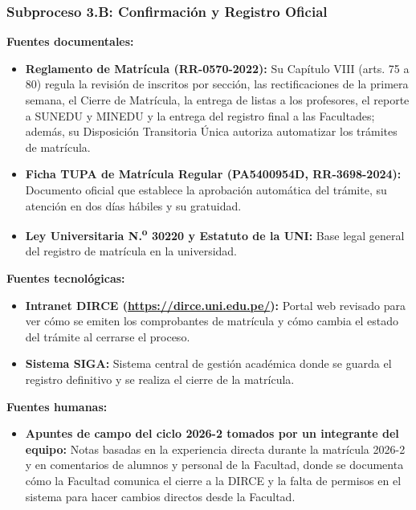 \subsubsection{Subproceso 3.B: Confirmación y Registro Oficial}

\textbf{Fuentes documentales:}
\begin{itemize}
    \item \textbf{Reglamento de Matrícula (RR-0570-2022):} Su Capítulo VIII (arts. 75\textdegree{} a 80\textdegree{}) regula la revisión de inscritos por sección, las rectificaciones de la primera semana, el Cierre de Matrícula, la entrega de listas a los profesores, el reporte a SUNEDU y MINEDU y la entrega del registro final a las Facultades; además, su Disposición Transitoria Única autoriza automatizar los trámites de matrícula.
    \item \textbf{Ficha TUPA de Matrícula Regular (PA5400954D, RR-3698-2024):} Documento oficial que establece la aprobación automática del trámite, su atención en dos días hábiles y su gratuidad.
    \item \textbf{Ley Universitaria N.\textsuperscript{o} 30220 y Estatuto de la UNI:} Base legal general del registro de matrícula en la universidad.
\end{itemize}

\textbf{Fuentes tecnológicas:}
\begin{itemize}
    \item \textbf{Intranet DIRCE (\url{https://dirce.uni.edu.pe/}):} Portal web revisado para ver cómo se emiten los comprobantes de matrícula y cómo cambia el estado del trámite al cerrarse el proceso.
    \item \textbf{Sistema SIGA:} Sistema central de gestión académica donde se guarda el registro definitivo y se realiza el cierre de la matrícula.
\end{itemize}

\textbf{Fuentes humanas:}
\begin{itemize}
    \item \textbf{Apuntes de campo del ciclo 2026-2 tomados por un integrante del equipo:} Notas basadas en la experiencia directa durante la matrícula 2026-2 y en comentarios de alumnos y personal de la Facultad, donde se documenta cómo la Facultad comunica el cierre a la DIRCE y la falta de permisos en el sistema para hacer cambios directos desde la Facultad.
\end{itemize}
